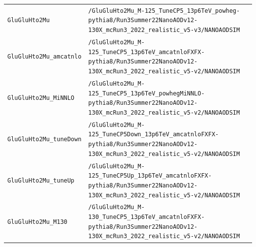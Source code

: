 \begin{longtable}{@{}>{\RaggedRight\arraybackslash}p{} >{\RaggedRight\arraybackslash}p{}@{}}
\addlinespace[2pt]
\texttt{GluGluHto2Mu} & \texttt{/\allowbreak{}GluGluHto2Mu\_\allowbreak{}M-\allowbreak{}125\_\allowbreak{}TuneCP5\_\allowbreak{}13p6TeV\_\allowbreak{}powheg-\allowbreak{}pythia8/\allowbreak{}Run3Summer22NanoAODv12-\allowbreak{}130X\_\allowbreak{}mcRun3\_\allowbreak{}2022\_\allowbreak{}realistic\_\allowbreak{}v5-\allowbreak{}v3/\allowbreak{}NANOAODSIM} \\
\addlinespace[2pt]
\texttt{GluGluHto2Mu\_\allowbreak{}amcatnlo} & \texttt{/\allowbreak{}GluGluHto2Mu\_\allowbreak{}M-\allowbreak{}125\_\allowbreak{}TuneCP5\_\allowbreak{}13p6TeV\_\allowbreak{}amcatnloFXFX-\allowbreak{}pythia8/\allowbreak{}Run3Summer22NanoAODv12-\allowbreak{}130X\_\allowbreak{}mcRun3\_\allowbreak{}2022\_\allowbreak{}realistic\_\allowbreak{}v5-\allowbreak{}v2/\allowbreak{}NANOAODSIM} \\
\addlinespace[2pt]
\texttt{GluGluHto2Mu\_\allowbreak{}MiNNLO} & \texttt{/\allowbreak{}GluGluHto2Mu\_\allowbreak{}M-\allowbreak{}125\_\allowbreak{}TuneCP5\_\allowbreak{}13p6TeV\_\allowbreak{}powhegMiNNLO-\allowbreak{}pythia8/\allowbreak{}Run3Summer22NanoAODv12-\allowbreak{}130X\_\allowbreak{}mcRun3\_\allowbreak{}2022\_\allowbreak{}realistic\_\allowbreak{}v5-\allowbreak{}v2/\allowbreak{}NANOAODSIM} \\
\addlinespace[2pt]
\texttt{GluGluHto2Mu\_\allowbreak{}tuneDown} & \texttt{/\allowbreak{}GluGluHto2Mu\_\allowbreak{}M-\allowbreak{}125\_\allowbreak{}TuneCP5Down\_\allowbreak{}13p6TeV\_\allowbreak{}amcatnloFXFX-\allowbreak{}pythia8/\allowbreak{}Run3Summer22NanoAODv12-\allowbreak{}130X\_\allowbreak{}mcRun3\_\allowbreak{}2022\_\allowbreak{}realistic\_\allowbreak{}v5-\allowbreak{}v2/\allowbreak{}NANOAODSIM} \\
\addlinespace[2pt]
\texttt{GluGluHto2Mu\_\allowbreak{}tuneUp} & \texttt{/\allowbreak{}GluGluHto2Mu\_\allowbreak{}M-\allowbreak{}125\_\allowbreak{}TuneCP5Up\_\allowbreak{}13p6TeV\_\allowbreak{}amcatnloFXFX-\allowbreak{}pythia8/\allowbreak{}Run3Summer22NanoAODv12-\allowbreak{}130X\_\allowbreak{}mcRun3\_\allowbreak{}2022\_\allowbreak{}realistic\_\allowbreak{}v5-\allowbreak{}v2/\allowbreak{}NANOAODSIM} \\
\addlinespace[2pt]
\texttt{GluGluHto2Mu\_\allowbreak{}M130} & \texttt{/\allowbreak{}GluGluHto2Mu\_\allowbreak{}M-\allowbreak{}130\_\allowbreak{}TuneCP5\_\allowbreak{}13p6TeV\_\allowbreak{}amcatnloFXFX-\allowbreak{}pythia8/\allowbreak{}Run3Summer22NanoAODv12-\allowbreak{}130X\_\allowbreak{}mcRun3\_\allowbreak{}2022\_\allowbreak{}realistic\_\allowbreak{}v5-\allowbreak{}v2/\allowbreak{}NANOAODSIM} \\

\end{longtable}
